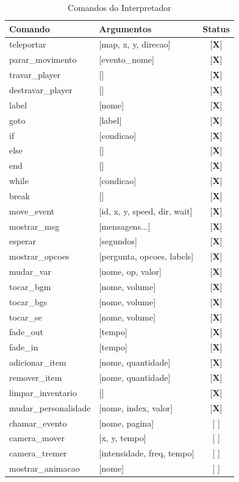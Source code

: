 \documentclass[12pt]{article}
\newcommand{\ok}{\textcolor{verde}{[\textbf{X}]}}
\newcommand{\pendente}{\textcolor{vermelho}{[\textbf{ }]}}
\begin{document}
\begin{table}[H]
\centering
\small
\begin{tabular}{|l|l|c|}
\hline
\textbf{Comando} & \textbf{Argumentos} & \textbf{Status} \\
\hline
teleportar & [map, x, y, direcao] & \ok \\
parar\_movimento & [evento\_nome] & \ok \\
travar\_player & [] & \ok \\
destravar\_player & [] & \ok \\
label & [nome] & \ok \\
goto & [label] & \ok \\
if & [condicao] & \ok \\
else & [] & \ok \\
end & [] & \ok \\
while & [condicao] & \ok \\
break & [] & \ok \\
move\_event & [id, x, y, speed, dir, wait] & \ok \\
mostrar\_msg & [mensagens...] & \ok \\
esperar & [segundos] & \ok \\
mostrar\_opcoes & [pergunta, opcoes, labels] & \ok \\
mudar\_var & [nome, op, valor] & \ok \\
tocar\_bgm & [nome, volume] & \ok \\
tocar\_bgs & [nome, volume] & \ok \\
tocar\_se & [nome, volume] & \ok \\
fade\_out & [tempo] & \ok \\
fade\_in & [tempo] & \ok \\
adicionar\_item & [nome, quantidade] & \ok \\
remover\_item & [nome, quantidade] & \ok \\
limpar\_inventario & [] & \ok \\
\hline
mudar\_personalidade & [nome, index, valor] & \ok \\
chamar\_evento & [nome, pagina] & \pendente \\
camera\_mover & [x, y, tempo] & \pendente \\
camera\_tremer & [intensidade, freq, tempo] & \pendente \\
mostrar\_animacao & [nome] & \pendente \\
\hline
\end{tabular}
\caption{Comandos do Interpretador}
\end{table}
\end{document}
